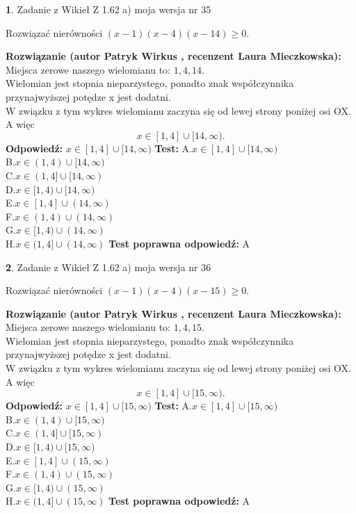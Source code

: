 \documentclass[12pt, a4paper]{article}
\theoremstyle{definition} %
\newtheorem{zad}{}
\newcommand{\zadStart}[1]{\begin{zad}#1\newline}
\newcommand{\zadStop}{\end{zad}}
\newcommand{\rozwStart}[2]{\noindent \textbf{Rozwiązanie (autor #1 , recenzent #2): }\newline}
\newcommand{\rozwStop}{\newline}
\newcommand{\odpStart}{\noindent \textbf{Odpowiedź:}\newline}
\newcommand{\odpStop}{\newline}
\newcommand{\testStart}{\noindent \textbf{Test:}\newline}
\newcommand{\testStop}{\newline}
\newcommand{\kluczStart}{\noindent \textbf{Test poprawna odpowiedź:}\newline}
\newcommand{\kluczStop}{\newline}
\begin{document}
\zadStart{Zadanie z Wikieł Z 1.62 a) moja wersja nr 35}

Rozwiązać nierówności $(x-1)(x-4)(x-14)\ge0$.
\zadStop
\rozwStart{Patryk Wirkus}{Laura Mieczkowska}
Miejsca zerowe naszego wielomianu to: $1, 4, 14$.\\
Wielomian jest stopnia nieparzystego, ponadto znak współczynnika przy\linebreak najwyższej potędze x jest dodatni.\\ W związku z tym wykres wielomianu zaczyna się od lewej strony poniżej osi OX. A więc $$x \in [1,4] \cup [14,\infty).$$
\rozwStop
\odpStart
$x \in [1,4] \cup [14,\infty)$
\odpStop
\testStart
A.$x \in [1,4] \cup [14,\infty)$\\
B.$x \in (1,4) \cup [14,\infty)$\\
C.$x \in (1,4] \cup [14,\infty)$\\
D.$x \in [1,4) \cup [14,\infty)$\\
E.$x \in [1,4] \cup (14,\infty)$\\
F.$x \in (1,4) \cup (14,\infty)$\\
G.$x \in [1,4) \cup (14,\infty)$\\
H.$x \in (1,4] \cup (14,\infty)$
\testStop
\kluczStart
A
\kluczStop



\zadStart{Zadanie z Wikieł Z 1.62 a) moja wersja nr 36}

Rozwiązać nierówności $(x-1)(x-4)(x-15)\ge0$.
\zadStop
\rozwStart{Patryk Wirkus}{Laura Mieczkowska}
Miejsca zerowe naszego wielomianu to: $1, 4, 15$.\\
Wielomian jest stopnia nieparzystego, ponadto znak współczynnika przy\linebreak najwyższej potędze x jest dodatni.\\ W związku z tym wykres wielomianu zaczyna się od lewej strony poniżej osi OX. A więc $$x \in [1,4] \cup [15,\infty).$$
\rozwStop
\odpStart
$x \in [1,4] \cup [15,\infty)$
\odpStop
\testStart
A.$x \in [1,4] \cup [15,\infty)$\\
B.$x \in (1,4) \cup [15,\infty)$\\
C.$x \in (1,4] \cup [15,\infty)$\\
D.$x \in [1,4) \cup [15,\infty)$\\
E.$x \in [1,4] \cup (15,\infty)$\\
F.$x \in (1,4) \cup (15,\infty)$\\
G.$x \in [1,4) \cup (15,\infty)$\\
H.$x \in (1,4] \cup (15,\infty)$
\testStop
\kluczStart
A
\kluczStop
\end{document}
